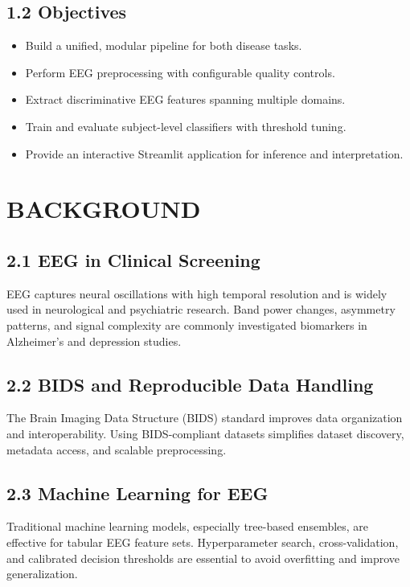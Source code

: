 \documentclass[12pt,a4paper]{report}
\begin{document}
\section*{1.2 Objectives}
\begin{itemize}
    \item Build a unified, modular pipeline for both disease tasks.
    \item Perform EEG preprocessing with configurable quality controls.
    \item Extract discriminative EEG features spanning multiple domains.
    \item Train and evaluate subject-level classifiers with threshold tuning.
    \item Provide an interactive Streamlit application for inference and interpretation.
\end{itemize}

\chapter{BACKGROUND}
\section*{2.1 EEG in Clinical Screening}
\justifying
EEG captures neural oscillations with high temporal resolution and is widely used in neurological and psychiatric research. Band power changes, asymmetry patterns, and signal complexity are commonly investigated biomarkers in Alzheimer's and depression studies.

\section*{2.2 BIDS and Reproducible Data Handling}
\justifying
The Brain Imaging Data Structure (BIDS) standard improves data organization and interoperability. Using BIDS-compliant datasets simplifies dataset discovery, metadata access, and scalable preprocessing.

\section*{2.3 Machine Learning for EEG}
\justifying
Traditional machine learning models, especially tree-based ensembles, are effective for tabular EEG feature sets. Hyperparameter search, cross-validation, and calibrated decision thresholds are essential to avoid overfitting and improve generalization.
\end{document}
